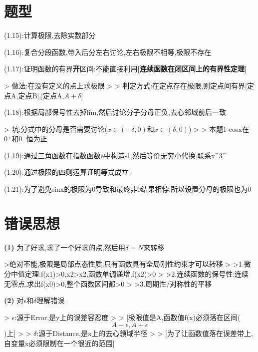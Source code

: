 \documentclass[11pt,a4paper,UTF8]{ctexart}
\begin{document}
\section{题型}

    (1.15):计算极限,去除实数部分

    (1.16):复合分段函数,带入后分左右讨论,左右极限不相等,极限不存在

    (1.17):证明函数的有界\textbf{开}区间:不能直接利用\textbf{[连续函数在闭区间上的有界性定理]}

\begin{solbox}[{分步推导与答题规范}]
    >   做法:在没有定义的点上求极限
    >
    >   判定方式:在定点存在极限,则定点间有界[定点A,定点B],[定点A,$A+\delta$]
\end{solbox}

    (1.18):根据局部保号性去掉lim,然后讨论分子分母正负,去心邻域前后一致

\begin{solbox}[{分步推导与答题规范}]
    >   \textit{}坑:分式中的分母是否需要讨论($x \in (-\delta, 0)$和$x \in (\delta, 0)$)\textit{}
    >
    >   本题1-cosx在$0^+$和$0^-$恒为正
\end{solbox}

    (1.19):通过三角函数在指数函数e中构造-1,然后等价无穷小代换,联系x\textasciicircum{}3\textasciicircum{}

    (1.20):通过极限的四则运算证明等式成立

    (1.21):为了避免sinx的极限为0导致和最终非0结果相悖,所以设置分母的极限也为0


\section{错误思想}

\textbf{(1)} 为了好求,求了一个好求的点,然后用$\delta=N$来转移

\begin{solbox}[{分步推导与答题规范}]
    >绝对不能,极限是局部点态性质;只有函数具有全局刚性约束才可以转移
    >
    >1.微分中值定理:f(x1)>0,x2>x2,函数单调递增,f(x2)>0
    >
    >2.连续函数的保号性:连续无零点,求出f(x0)>0,整个函数区间都>0
    >
    >3.周期性/对称性的平移
\end{solbox}

\textbf{(2)} 对$\epsilon$和$\delta$理解错误

\begin{solbox}[{分步推导与答题规范}]
    >   $\epsilon$:源于Error,是y上的误差容忍度	
    >
    >   [极限值是A,函数值f(x)必须落在区间(
\begin{equation*}
A-\epsilon,A+\epsilon
\end{equation*}
)上]
    >
    >   $\delta$:源于Distance,是x上的去心领域半径
    >
    >   [为了让函数值落在误差带上,自变量x必须限制在一个很近的范围]
\end{solbox}
\end{document}
